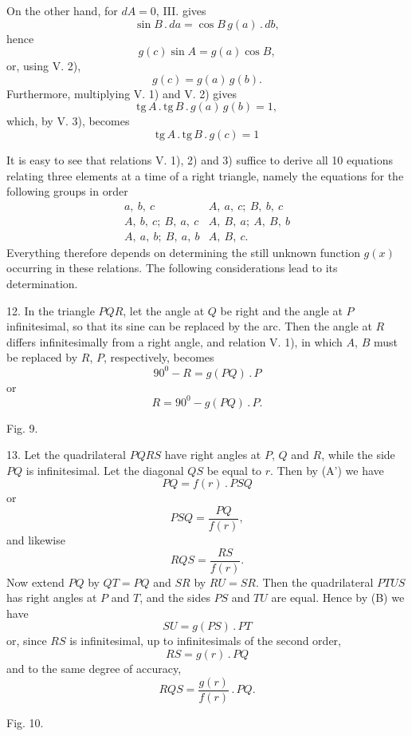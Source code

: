 %
\noindent On the other hand, for $dA = 0$, III. gives
\[
\sin B \,.\, da = \cos B\, g(a) \,.\, db,
\]
hence
\[
g(c) \sin A = g(a) \cos B,
\]
or, using V. 2),
\[
\tag*{V. 3)} g(c) = g(a)\, g(b).
\]
Furthermore, multiplying V. 1) and V. 2) gives
\[
\mathrm{tg}\, A \,.\, \mathrm{tg}\, B \,.\, g(a)\, g(b) = 1,
\]
which, by V. 3), becomes
\[
\tag*{V. 4)} \mathrm{tg}\, A \,.\, \mathrm{tg}\, B \,.\, g(c) = 1
\]


It is easy to see that relations V. 1), 2) and 3) suffice to derive all
10 equations relating three elements at a time of a right triangle,
namely the equations for the following groups in order
\[
\begin{array}{ll}
a,\ b,\ c & A,\ a,\ c;\ B,\ b,\ c\\
A,\ b,\ c;\ B,\ a,\ c & A,\ B,\ a;\ A,\ B,\ b\\
A,\ a,\ b;\ B,\ a,\ b & A,\ B,\ c.
\end{array}
\]
Everything therefore depends on determining the still unknown
function $g(x)$ occurring in these relations. The following considerations
lead to its determination.

12. In the triangle $PQR$, let the angle at $Q$ be right and the angle at $P$
infinitesimal, so that its sine can be replaced by the arc. Then
the angle at $R$ differs infinitesimally from a right angle, and
relation V. 1), in which $A$, $B$ must be replaced by $R$, $P$, respectively, becomes
\[
90^{0} - R = g(PQ) \,.\, P
\]
or
\[
\tag*{(C)} R = 90^{0} - g(PQ) \,.\, P.
\]

\begin{center}\begin{minipage}{\linewidth}\centering


Fig. 9.
\end{minipage}\end{center}

13. Let the quadrilateral $PQRS$ have right angles at $P$, $Q$ and $R$, while the side
$PQ$ is infinitesimal. Let the diagonal $QS$ be equal to $r$. Then by
(A') we have
\[
PQ = f(r) \,.\, PSQ
\]
or
\[
PSQ = \frac{PQ}{f(r)},
\]
and likewise
\[
RQS = \frac{RS}{f(r)}.
\]
Now extend $PQ$ by $QT = PQ$ and $SR$ by $RU = SR$. Then the quadrilateral
$PTUS$ has right angles at $P$ and $T$, and the sides $PS$ and $TU$ are
equal. Hence by (B) we have
\[
SU = g(PS) \,.\, PT
\]
or, since $RS$ is infinitesimal, up to infinitesimals of the second
order,
\[
RS = g(r) \,.\, PQ
\]
and to the same degree of accuracy,
\[
\tag*{7)} RQS = \frac{g(r)}{f(r)} \,.\, PQ.
\]

\begin{center}\begin{minipage}{\linewidth}\centering


Fig. 10.
\end{minipage}\end{center}
